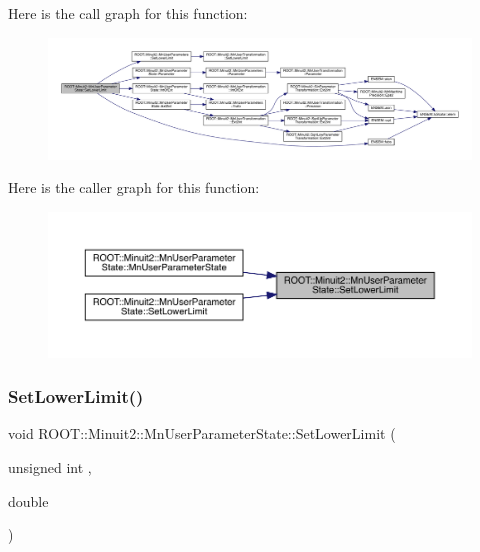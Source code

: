 Here is the call graph for this function\+:
\nopagebreak
\begin{figure}[H]
\begin{center}
\leavevmode
\includegraphics[width=350pt]{d3/de0/classROOT_1_1Minuit2_1_1MnUserParameterState_ae2601510da37a8571b0b22fe0e960b51_cgraph}
\end{center}
\end{figure}
Here is the caller graph for this function\+:
\nopagebreak
\begin{figure}[H]
\begin{center}
\leavevmode
\includegraphics[width=350pt]{d3/de0/classROOT_1_1Minuit2_1_1MnUserParameterState_ae2601510da37a8571b0b22fe0e960b51_icgraph}
\end{center}
\end{figure}
\mbox{\label{classROOT_1_1Minuit2_1_1MnUserParameterState_ae2601510da37a8571b0b22fe0e960b51}} 
\subsubsection{\texorpdfstring{SetLowerLimit()}{SetLowerLimit()}\hspace{0.1cm}{\footnotesize\ttfamily [3/6]}}
{\footnotesize\ttfamily void R\+O\+O\+T\+::\+Minuit2\+::\+Mn\+User\+Parameter\+State\+::\+Set\+Lower\+Limit (\begin{DoxyParamCaption}\item[{unsigned int}]{,  }\item[{double}]{ }\end{DoxyParamCaption})}

